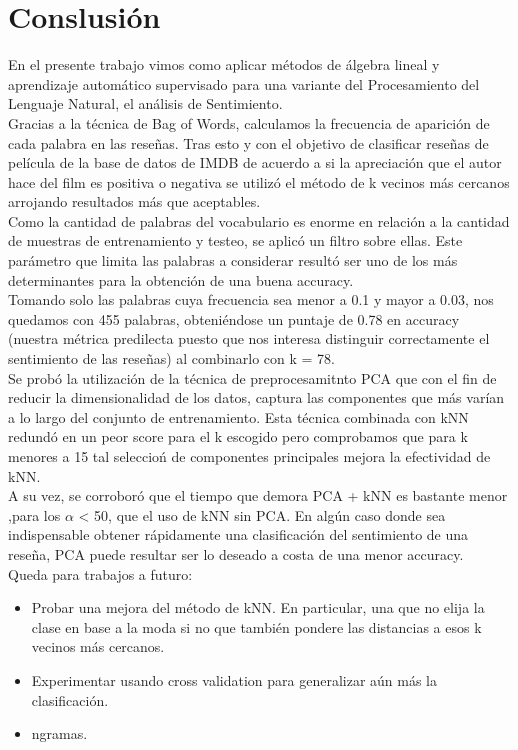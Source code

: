 \section{Conslusión}

En el presente trabajo vimos como aplicar métodos de álgebra lineal y aprendizaje automático supervisado para una variante del Procesamiento del Lenguaje Natural, el análisis de Sentimiento. \\
Gracias a la técnica de Bag of Words, calculamos la frecuencia de aparición de cada palabra en las reseñas.
Tras esto y con el objetivo de clasificar reseñas de película de la base de datos de IMDB de acuerdo a si la apreciación que el autor hace del film es positiva o negativa se utilizó el método de k vecinos más cercanos arrojando resultados más que aceptables.\\

Como la cantidad de palabras del vocabulario es enorme en relación a la cantidad de muestras de entrenamiento y testeo, se aplicó un filtro sobre ellas. Este parámetro que limita las palabras a considerar resultó ser uno de los más determinantes para la obtención de una buena accuracy.\\
Tomando solo las palabras cuya frecuencia sea menor a 0.1 y mayor a 0.03, nos quedamos con 455 palabras, obteniéndose un puntaje de 0.78 en accuracy (nuestra métrica predilecta puesto que nos interesa distinguir correctamente el sentimiento de las reseñas) al combinarlo con k = 78. \\

Se probó la utilización de la técnica de preprocesamitnto PCA que con el fin de reducir la dimensionalidad de los datos, captura las componentes que más varían a lo largo del conjunto de entrenamiento. Esta técnica combinada con kNN redundó en un peor score para el k escogido pero comprobamos que para k menores a 15 tal seleccioń de componentes principales mejora la efectividad de kNN. \\
A su vez, se corroboró que el tiempo que demora PCA + kNN es bastante menor ,para los $\alpha$ < 50, que el uso de kNN sin PCA. En algún caso donde sea indispensable obtener rápidamente una clasificación del sentimiento de una reseña, PCA puede resultar ser lo deseado a costa de una menor accuracy. \\

Queda para trabajos a futuro: 
\begin{itemize}
\item Probar una mejora del método de kNN. En particular, una que no elija la clase en base a la moda si no que también pondere las distancias a esos k vecinos más cercanos.
\item Experimentar usando cross validation para generalizar aún más la clasificación.
\item ngramas. 
\end{itemize}